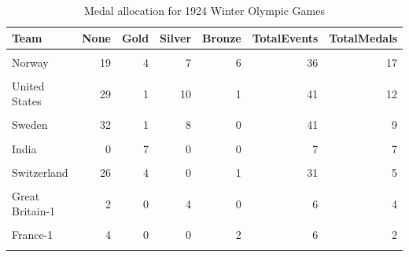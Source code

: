 \documentclass[
]{article}
\begin{document}
\newpage

\begin{table}[H]
\centering
\caption{\label{tab:WinterBreakDownWinners1}Medal allocation for 1924 Winter Olympic Games}
\centering
\fontsize{7}{9}\selectfont
\begin{tabular}[t]{lrrrrrr}
\toprule
Team & None & Gold & Silver & Bronze & TotalEvents & TotalMedals\\
\midrule
\cellcolor{gray!10}{Great Britain} & \cellcolor{gray!10}{11} & \cellcolor{gray!10}{16} & \cellcolor{gray!10}{0} & \cellcolor{gray!10}{11} & \cellcolor{gray!10}{38} & \cellcolor{gray!10}{27}\\
Norway & 19 & 4 & 7 & 6 & 36 & 17\\
\cellcolor{gray!10}{Finland} & \cellcolor{gray!10}{18} & \cellcolor{gray!10}{4} & \cellcolor{gray!10}{8} & \cellcolor{gray!10}{3} & \cellcolor{gray!10}{33} & \cellcolor{gray!10}{15}\\
United States & 29 & 1 & 10 & 1 & 41 & 12\\
\cellcolor{gray!10}{Canada} & \cellcolor{gray!10}{8} & \cellcolor{gray!10}{9} & \cellcolor{gray!10}{0} & \cellcolor{gray!10}{0} & \cellcolor{gray!10}{17} & \cellcolor{gray!10}{9}\\
\addlinespace
Sweden & 32 & 1 & 8 & 0 & 41 & 9\\
\cellcolor{gray!10}{France} & \cellcolor{gray!10}{48} & \cellcolor{gray!10}{0} & \cellcolor{gray!10}{0} & \cellcolor{gray!10}{8} & \cellcolor{gray!10}{56} & \cellcolor{gray!10}{8}\\
India & 0 & 7 & 0 & 0 & 7 & 7\\
\cellcolor{gray!10}{Belgium-1} & \cellcolor{gray!10}{0} & \cellcolor{gray!10}{0} & \cellcolor{gray!10}{0} & \cellcolor{gray!10}{5} & \cellcolor{gray!10}{5} & \cellcolor{gray!10}{5}\\
Switzerland & 26 & 4 & 0 & 1 & 31 & 5\\
\addlinespace
\cellcolor{gray!10}{Austria} & \cellcolor{gray!10}{0} & \cellcolor{gray!10}{3} & \cellcolor{gray!10}{1} & \cellcolor{gray!10}{0} & \cellcolor{gray!10}{4} & \cellcolor{gray!10}{4}\\
Great Britain-1 & 2 & 0 & 4 & 0 & 6 & 4\\
\cellcolor{gray!10}{Switzerland-1} & \cellcolor{gray!10}{0} & \cellcolor{gray!10}{4} & \cellcolor{gray!10}{0} & \cellcolor{gray!10}{0} & \cellcolor{gray!10}{4} & \cellcolor{gray!10}{4}\\
France-1 & 4 & 0 & 0 & 2 & 6 & 2\\
\cellcolor{gray!10}{Australia} & \cellcolor{gray!10}{0} & \cellcolor{gray!10}{1} & \cellcolor{gray!10}{0} & \cellcolor{gray!10}{0} & \cellcolor{gray!10}{1} & \cellcolor{gray!10}{1}\\

\end{tabular}
\end{table}
\end{document}
